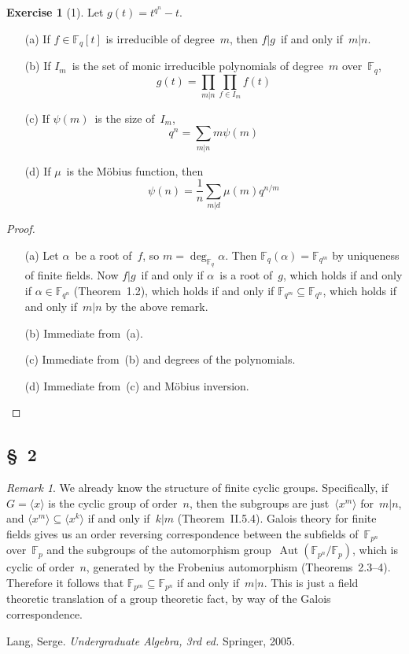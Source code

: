 \documentclass[letterpaper,12pt]{article}
\newcommand{\F}{\mathbb{F}}
\DeclareMathOperator{\Aut}{\mathrm{Aut}}
\newcommand{\gen}[1]{\langle{#1}\rangle}
\theoremstyle{definition}
\newtheorem*{exer}{Exercise}
\theoremstyle{remark}
\newtheorem*{rmk}{Remark}
\theoremstyle{direction}
\begin{document}
\begin{exer}[1]
Let \(g(t)=t^{q^n}-t\).
\begin{enumerate}[itemsep=0pt]
\item[(a)] If \(f\in\F_q[t]\) is irreducible of degree~\(m\), then \(f|g\)~if and only if~\(m|n\).
\item[(b)] If \(I_m\)~is the set of monic irreducible polynomials of degree~\(m\) over~\(\F_q\),
\[g(t)=\prod_{m|n}\prod_{f\in I_m}f(t)\]
\item[(c)] If \(\psi(m)\)~is the size of~\(I_m\),
\[q^n=\sum_{m|n}m\psi(m)\]
\item[(d)] If \(\mu\)~is the M\"obius function, then
\[\psi(n)=\frac{1}{n}\sum_{m|d}\mu(m)q^{n/m}\]
\end{enumerate}
\end{exer}
\begin{proof}\
\begin{enumerate}[itemsep=0pt]
\item[(a)] Let \(\alpha\)~be a root of~\(f\), so \(m=\deg_{\F_q}\alpha\). Then \(\F_q(\alpha)=\F_{q^m}\) by uniqueness of finite fields. Now \(f|g\)~if and only if \(\alpha\)~is a root of~\(g\), which holds if and only if \(\alpha\in\F_{q^n}\) (Theorem~1.2), which holds if and only if \(\F_{q^m}\subseteq\F_{q^n}\), which holds if and only if~\(m|n\) by the above remark.
\item[(b)] Immediate from~(a).
\item[(c)] Immediate from~(b) and degrees of the polynomials.
\item[(d)] Immediate from~(c) and M\"obius inversion.\qedhere
\end{enumerate}
\end{proof}

\subsection*{\S~2}
\begin{rmk}
We already know the structure of finite cyclic groups. Specifically, if \(G=\gen{x}\) is the cyclic group of order~\(n\), then the subgroups are just~\(\gen{x^m}\) for~\(m|n\), and \(\gen{x^m}\subseteq\gen{x^k}\) if and only if~\(k|m\) (Theorem~II.5.4). Galois theory for finite fields gives us an order reversing correspondence between the subfields of~\(\F_{p^n}\) over~\(\F_p\) and the subgroups of the automorphism group~\(\Aut(\F_{p^n}/\F_p)\), which is cyclic of order~\(n\), generated by the Frobenius automorphism (Theorems~2.3--4). Therefore it follows that \(\F_{p^m}\subseteq\F_{p^n}\) if and only if~\(m|n\). This is just a field theoretic translation of a group theoretic fact, by way of the Galois correspondence.
\end{rmk}

\begin{thebibliography}{0}
 Lang, Serge. \textit{Undergraduate Algebra, 3rd ed.} Springer, 2005.
\end{thebibliography}
\end{document}
